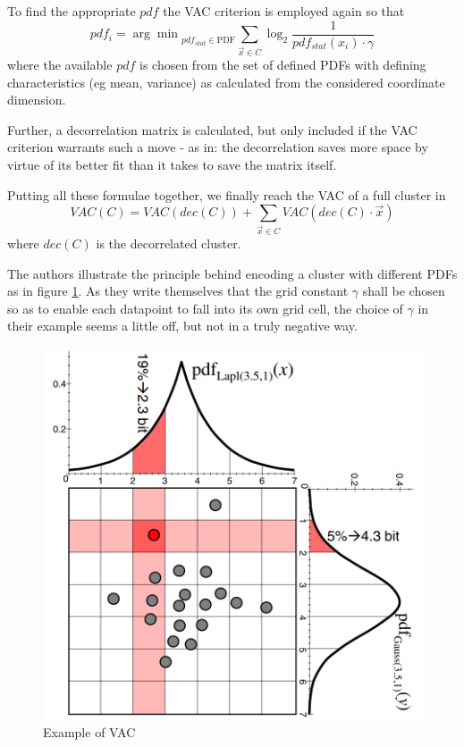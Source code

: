\documentclass[conference]{IEEEtran}
\begin{document}
To find the appropriate $ pdf $ the VAC criterion is employed again so that
\[ pdf_i = {\arg\min}_{pdf_{stat} \in \text{PDF}} \sum_{\vec{x} \in C} \log_2 \frac{1}{pdf_{stat}(x_i) \cdot \gamma} \]
where the available $ pdf $ is chosen from the set of defined PDFs with defining characteristics (eg mean, variance) as calculated from the considered coordinate dimension.

Further, a decorrelation matrix is calculated, but only included if the VAC criterion warrants such a move - as in: the decorrelation saves more space by virtue of its better fit than it takes to save the matrix itself.

Putting all these formulae together, we finally reach the VAC of a full cluster in 
\[ VAC(C) = VAC(dec(C)) + \sum_{\vec{x} \in C} VAC(dec(C) \cdot \vec{x}) \]
where $ dec(C) $ is the decorrelated cluster.

The authors illustrate the principle behind encoding a cluster with different PDFs as in figure \ref{fig:vac}. As they write themselves that the grid constant $ \gamma $ shall be chosen so as to enable each datapoint to fall into its own grid cell, the choice of $ \gamma $ in their example seems a little off, but not in a truly negative way.

\begin{figure}
  \centering
  \noindent\includegraphics[width=\linewidth]{imgs/vac}
  \caption[]{Example of VAC\cite{Bohm2006-ts}}
  \label{fig:vac}
\end{figure}
\end{document}
